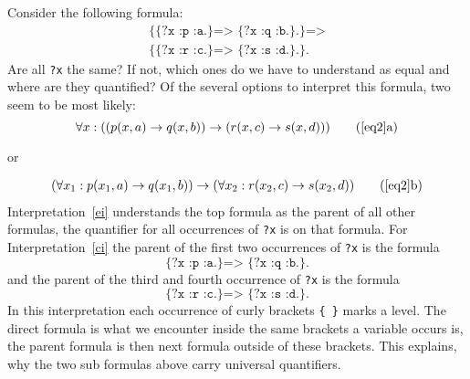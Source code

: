 Consider the following formula:
\begin{multline}
\texttt{\{\{?x :p :a.\} => \{?x :q :b.\}.\} =>}\\
\texttt{\{\{?x :r :c.\} => \{?x :s :d.\}.\}.} \label{eq2} \end{multline}
Are all \verb!?x! the same? If not, which ones do we have to understand as equal and where are they quantified? 
Of the several options to interpret this formula, two seem to be most likely:
\[\forall x: ((p(x,a)\rightarrow q(x,b))\rightarrow ( r(x,c) \rightarrow s(x,d)))\tag{\ref{eq2}a}\label{ei}\]
\begin{center}or\end{center}
\vspace{-\baselineskip}
\begin{multline}
(\forall x_1: p(x_1,a)\rightarrow q(x_1,b))\rightarrow (\forall x_2: r(x_2,c) \rightarrow s(x_2,d))\tag{\ref{eq2}b}\label{ci}
\end{multline}
Interpretation~\ref{ei} understands the top formula as the parent of all other formulas, the quantifier for all occurrences of \texttt{?x} is on that formula.
For Interpretation~\ref{ci} the parent of the first two occurrences of \texttt{?x} is the formula 
\begin{equation}
\texttt{\{?x :p :a.\} => \{?x :q :b.\}.}\label{sub1}
\end{equation}
and the parent of the third and fourth occurrence of \texttt{?x} is the formula
\begin{equation}\texttt{\{?x :r :c.\} => \{?x :s :d.\}.}\label{sub2}\end{equation}
In this interpretation each occurrence of curly brackets \texttt{\{ \}} marks a level. The direct formula is what we encounter inside the same brackets a variable occurs is, the parent formula is then next formula 
outside of these brackets. This explains, why the two sub formulas above carry universal quantifiers.

